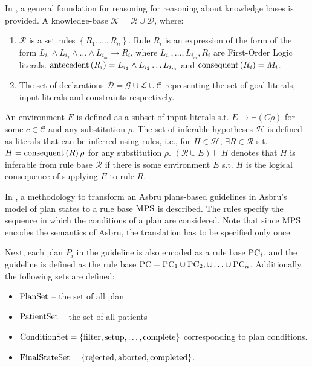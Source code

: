In \cite{PreeceJIS94}, a general foundation for reasoning for reasoning
about knowledge bases is provided. A knowledge-base $\mathcal{K} = \mathcal{R}
\cup \mathcal{D}$, where:
\begin{enumerate}
  \item $\mathcal{R}$ is a set rules $\left\{R_1, \dots, R_n\right\}$.
    Rule $R_i$ is an expression of the form of the form
    $L_{i_1} \wedge L_{i_2} \wedge \dots \wedge L_{i_m} \rightarrow R_i$,
    where $L_{i_1}, \dots, L_{i_m}, R_i$ are First-Order Logic literals.
    $\text{antecedent}\left(R_i\right) = L_{i_1} \wedge L_{i_2} \dots L_{i_m}$ and $\text{consequent}\left(R_i\right) = M_i$.
  \item The set of declarations $\mathcal{D} = \mathcal{G} \cup \mathcal{L} \cup
    \mathcal{C}$ representing the set of goal literals, input literals and
    constraints respectively.
\end{enumerate}
An environment $E$ is defined as a subset of input literals s.t. $E \to
\neg(C\rho)$ for some $c \in \mathcal{C}$ and any substitution $\rho$.
The set of inferable hypotheses $\mathcal{H}$ is defined as literals
that can be inferred using rules, i.e., for $H \in \mathcal{H}$,
$\exists R \in \mathcal{R}$ s.t. $H = \text{consequent}\left(R\right)\rho$ for any
substitution $\rho$. $\left(\mathcal{R} \cup E \right) \vdash H$
denotes that $H$ is inferable from rule base $\mathcal{R}$ if there
is some environment $E$ s.t. $H$ is the logical consequence of supplying
$E$ to rule $R$.

In \cite{DuftschmidAIM01}, a methodology to transform
an Asbru plans-based guidelines in
Asbru's model of plan states to a rule base $\text{MPS}{}$ is described.
The rules specify the sequence in which the conditions of a plan
are considered. Note that since $\text{MPS}$ encodes the semantics of Asbru,
the translation has to be specified only once.

Next, each plan $P_i$ in the guideline is also encoded as a rule base
$\text{PC}_i$, and the guideline is defined as the rule base $\text{PC} = \text{PC}_1 \cup \text{PC}_2,
\cup \dots \cup \text{PC}_n$. Additionally, the following sets are defined:
\begin{itemize}
  \item $\text{PlanSet}$ -- the set of all plan
  \item $\text{PatientSet}$ -- the set of all patients
  \item $\text{ConditionSet} = \left\{\text{filter}, \text{setup}, \dots,
    \text{complete}\right\}$ corresponding to plan conditions.
  \item $\text{FinalStateSet} = \left\{\text{rejected}, \text{aborted}, \text{completed}\right\}$.
\end{itemize}

